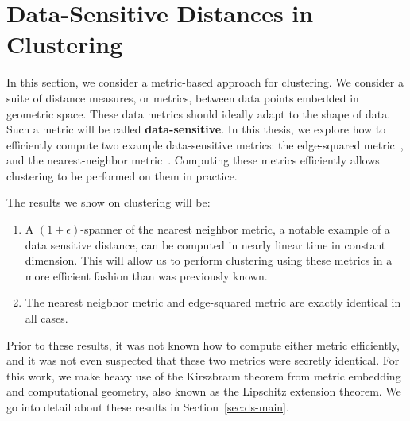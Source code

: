 \section{Data-Sensitive Distances in Clustering}\label{sec:ds}
%
 In this section, we consider a metric-based approach for clustering.  We consider a suite
  of distance measures, or metrics, between data points embedded in
  geometric space. These data metrics should ideally adapt to the shape
  of data. Such a metric will be called \textbf{data-sensitive}. In this thesis, we explore how to efficiently compute two
  example data-sensitive metrics: the edge-squared
  metric~\cite{vincent03}, and
  the nearest-neighbor metric~\cite{cohen15approximating}. Computing
  these metrics efficiently allows clustering to be performed on them in
  practice.

  The results we show on clustering will be:
  \begin{enumerate}
  \item A $(1+\epsilon)$-spanner of the nearest neighbor metric, a notable example of a data sensitive
  distance, can be computed in nearly linear time in constant dimension.
  This will allow us to perform clustering using these metrics in a more
  efficient fashion than was previously known.
  \item The nearest neigbhor metric and edge-squared metric are exactly
  identical in all cases.
  \end{enumerate}
  Prior to these results, it was not known how to compute either metric
  efficiently, and it was not even suspected that these two metrics were
  secretly identical. For this work, we make heavy use of the Kirszbraun theorem from
  metric embedding and computational geometry, also known as the Lipschitz extension theorem. We go into detail about these results in
  Section~\ref{sec:ds-main}.

